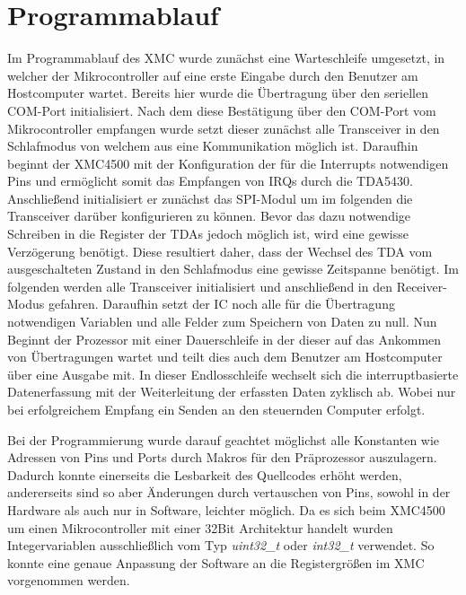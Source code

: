 \section{Programmablauf}
Im Programmablauf des XMC wurde zunächst eine Warteschleife umgesetzt, in welcher der Mikrocontroller auf eine erste Eingabe durch den Benutzer am Hostcomputer wartet. Bereits hier wurde die Übertragung über den seriellen COM-Port initialisiert. Nach dem diese Bestätigung über den COM-Port vom Mikrocontroller empfangen wurde setzt dieser zunächst alle Transceiver in den Schlafmodus von welchem aus eine Kommunikation möglich ist. Daraufhin beginnt der XMC4500 mit der Konfiguration der für die Interrupts notwendigen Pins und ermöglicht somit das Empfangen von \acp{IRQ} durch die TDA5430. Anschließend initialisiert er zunächst das SPI-Modul um im folgenden die Transceiver darüber konfigurieren zu können. Bevor das dazu notwendige Schreiben in die Register der TDAs jedoch möglich ist, wird eine gewisse Verzögerung benötigt. Diese resultiert daher, dass der Wechsel des TDA vom ausgeschalteten Zustand in den Schlafmodus eine gewisse Zeitspanne benötigt. 
Im folgenden werden alle Transceiver initialisiert und anschließend in den Receiver-Modus gefahren.  
Daraufhin setzt der \ac{IC} noch alle für die Übertragung notwendigen Variablen  und alle Felder zum Speichern von Daten zu null. 
Nun Beginnt der Prozessor mit einer Dauerschleife in der dieser auf das Ankommen von Übertragungen wartet und teilt dies auch dem Benutzer am Hostcomputer über eine Ausgabe mit. In dieser Endlosschleife wechselt sich die interruptbasierte Datenerfassung mit der Weiterleitung der erfassten Daten zyklisch ab. Wobei nur bei erfolgreichem Empfang ein Senden an den steuernden Computer erfolgt. 


Bei der Programmierung wurde darauf geachtet möglichst alle Konstanten wie Adressen von Pins und Ports durch Makros für den Präprozessor auszulagern. Dadurch konnte einerseits die Lesbarkeit des Quellcodes erhöht werden, andererseits sind so aber Änderungen durch vertauschen von Pins, sowohl in der Hardware als auch nur in Software, leichter möglich. Da es sich beim XMC4500 um einen Mikrocontroller mit einer 32Bit Architektur handelt wurden Integervariablen ausschließlich vom Typ \textit{uint32\_t} oder \textit{int32\_t} verwendet. So konnte eine genaue Anpassung der Software an die Registergrößen im XMC vorgenommen werden.



